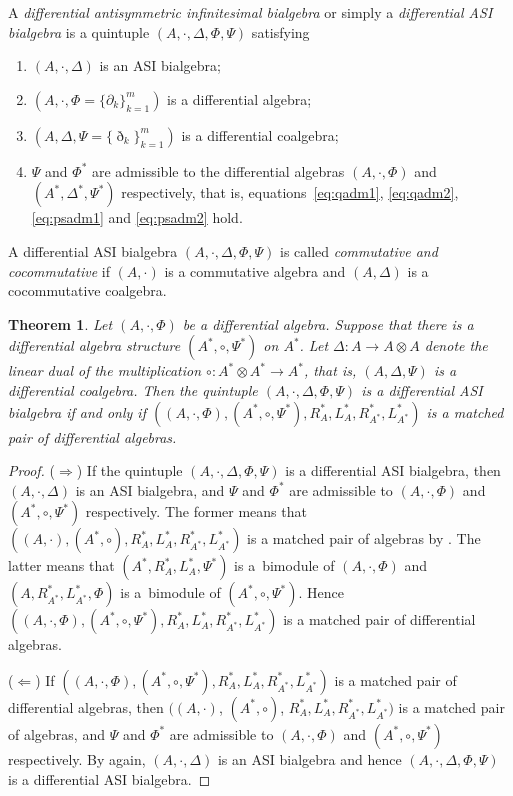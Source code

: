 \documentclass[10pt,a4paper]{amsart}
\numberwithin{equation}{section}
\newtheorem{Theorem}{Theorem}[section]
\begin{document}
\begin{Definition}\label{def:dasi}
 A \textit{differential antisymmetric infinitesimal bialgebra} or simply a \textit{differential ASI bialgebra} is a quintuple
 $(A, \cdot, \Delta, \Phi, \Psi)$ satisfying
 \begin{enumerate}\itemsep=0pt
 \item[(1)] $(A, \cdot, \Delta)$ is an ASI bialgebra;
 \item[(2)] $(A, \cdot, \Phi = \{\partial_k\}_{k=1}^m)$ is a differential algebra;
 \item[(3)] $(A, \Delta, \Psi = \{\eth_k\}_{k=1}^m)$ is a differential coalgebra;
 \item[(4)] $\Psi$ and $\Phi^*$ are admissible to the differential algebras $(A, \cdot, \Phi)$ and $(A^*, \Delta^*, \Psi^*)$ respectively, that is,
 equations~\eqref{eq:qadm1}, \eqref{eq:qadm2}, \eqref{eq:psadm1} and \eqref{eq:psadm2} hold.
 \end{enumerate}
 A differential ASI bialgebra $(A, \cdot, \Delta, \Phi, \Psi)$ is called \textit{commutative and cocommutative} if $(A, \cdot)$ is a commutative algebra and $(A, \Delta)$ is a cocommutative coalgebra.
\end{Definition}

\begin{Theorem}\label{thm:asimat}
 Let $(A, \cdot, \Phi)$ be a differential algebra.
 Suppose that there is a differential algebra structure $(A^*, \circ, \Psi^*)$ on $A^*$.
 Let $\Delta\colon A \to A \otimes A$ denote the linear dual of the multiplication $\circ\colon A^* \otimes A^* \to A^*$, that is, $(A, \Delta, \Psi)$ is a differential coalgebra.
 Then the quintuple $(A, \cdot, \Delta, \Phi, \Psi)$ is a differential ASI bialgebra if and only if $((A, \cdot, \Phi), (A^*, \circ, \Psi^*), R^*_A, L^*_A, R^*_{A^*}, L^*_{A^*})$ is a matched pair of differential algebras.
\end{Theorem}
\begin{proof}
 ($\Longrightarrow$)
 If the quintuple $(A, \cdot, \Delta, \Phi, \Psi)$ is a differential ASI bialgebra,
 then $(A, \cdot, \Delta)$ is an ASI bialgebra,
 and $\Psi$ and $\Phi^*$ are admissible to $(A, \cdot, \Phi)$ and $(A^*, \circ, \Psi^*)$ respectively.
 The former means that $((A, \cdot), (A^*, \circ), R^*_A, L^*_A, R^*_{A^*}, L^*_{A^*})$ is a matched pair of algebras by \cite[Theorem~2.2.3]{BaiDouble}.
 The latter means that $(A^*, R^*_A, L^*_A, \Psi^*)$ is a~bimodule of $(A, \cdot, \Phi)$
 and $(A, R^*_{A^*}, L^*_{A^*}, \Phi)$ is a~bimodule of $(A^*, \circ, \Psi^*)$.
 Hence $((A, \cdot, \Phi), (A^*, \circ, \Psi^*), R^*_A, L^*_A, R^*_{A^*}, L^*_{A^*})$ is a matched pair of differential algebras.

 ($\Longleftarrow$)
 If $((A, \cdot, \Phi), (A^*, \circ, \Psi^*), R^*_A, L^*_A, R^*_{A^*}, L^*_{A^*})$ is a matched pair of differential algebras,
 then $((A, \cdot)$, $(A^*, \circ)$, $R^*_A, L^*_A, R^*_{A^*}, L^*_{A^*})$ is a matched pair of algebras,
 and $\Psi$ and $\Phi^*$ are admissible to $(A, \cdot, \Phi)$ and $(A^*, \circ, \Psi^*)$ respectively.
 By \cite[Theorem~2.2.3]{BaiDouble} again, $(A, \cdot, \Delta)$ is an ASI bialgebra and hence $(A, \cdot, \Delta, \Phi, \Psi)$ is a differential ASI bialgebra.
\end{proof}
\end{document}
